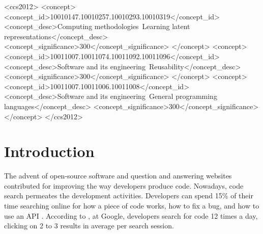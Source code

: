 \documentclass[sigconf]{acmart}
\begin{document}
\begin{CCSXML}
<ccs2012>
   <concept>
       <concept_id>10010147.10010257.10010293.10010319</concept_id>
       <concept_desc>Computing methodologies~Learning latent representations</concept_desc>
       <concept_significance>300</concept_significance>
       </concept>
   <concept>
       <concept_id>10011007.10011074.10011092.10011096</concept_id>
       <concept_desc>Software and its engineering~Reusability</concept_desc>
       <concept_significance>300</concept_significance>
       </concept>
   <concept>
       <concept_id>10011007.10011006.10011008</concept_id>
       <concept_desc>Software and its engineering~General programming languages</concept_desc>
       <concept_significance>300</concept_significance>
       </concept>
 </ccs2012>
\end{CCSXML}




\maketitle

\section{Introduction}

The advent of open-source software and question and answering websites contributed for improving the way developers produce code. Nowadays, code search permeates the development activities. Developers can spend 15\% of their time searching online for how a piece of code works, how to fix a bug, and how to use an API \cite{what-developers-search-for-on-the-web:xia:2017}. According to \citet{sadowski-how-developers-search-for-code-case-study:2015}, at Google, developers search for code 12 times a day, clicking on 2 to 3 results in average per search session.  
\end{document}

